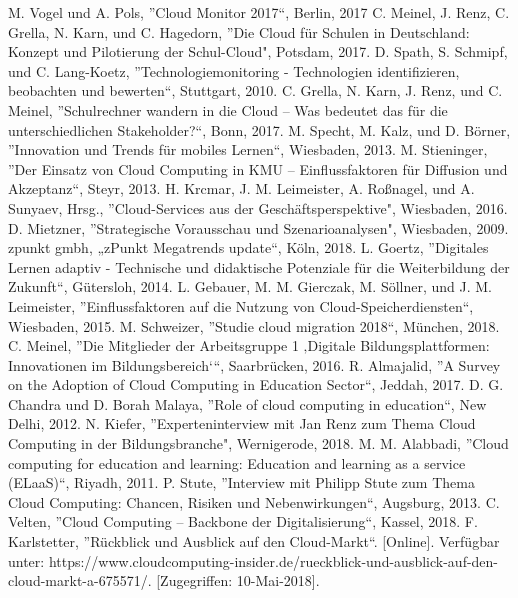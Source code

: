 \documentclass[conference]{IEEEtran}
\begin{document}
\begin{thebibliography}{00}
M. Vogel und A. Pols, ''Cloud Monitor 2017“, Berlin, 2017
 C. Meinel, J. Renz, C. Grella, N. Karn, und C. Hagedorn, ''Die Cloud für Schulen in Deutschland: Konzept und Pilotierung der Schul-Cloud", Potsdam, 2017.
D. Spath, S. Schmipf, und C. Lang-Koetz, ''Technologiemonitoring - Technologien identifizieren, beobachten und bewerten“, Stuttgart, 2010.
 C. Grella, N. Karn, J. Renz, und C. Meinel, ''Schulrechner wandern in die Cloud – Was bedeutet das für die unterschiedlichen Stakeholder?“, Bonn, 2017.
 M. Specht, M. Kalz, und D. Börner, ''Innovation und Trends für mobiles Lernen“, Wiesbaden, 2013.
 M. Stieninger, ''Der Einsatz von Cloud Computing in KMU – Einflussfaktoren für Diffusion und Akzeptanz“, Steyr, 2013.
 H. Krcmar, J. M. Leimeister, A. Roßnagel, und A. Sunyaev, Hrsg., ''Cloud-Services aus der Geschäftsperspektive", Wiesbaden, 2016.
 D. Mietzner, ''Strategische Vorausschau und Szenarioanalysen", Wiesbaden, 2009.
zpunkt gmbh, „zPunkt Megatrends update“, Köln, 2018.
 L. Goertz, ''Digitales Lernen adaptiv - Technische und didaktische Potenziale für die Weiterbildung der Zukunft“, Gütersloh, 2014.
 L. Gebauer, M. M. Gierczak, M. Söllner, und J. M. Leimeister, ''Einflussfaktoren auf die Nutzung von Cloud-Speicherdiensten“, Wiesbaden, 2015.
 M. Schweizer, ''Studie cloud migration 2018“, München, 2018.
 C. Meinel, ''Die Mitglieder der Arbeitsgruppe 1 ‚Digitale Bildungsplattformen: Innovationen im Bildungsbereich‘“, Saarbrücken, 2016.
 R. Almajalid, ''A Survey on the Adoption of Cloud Computing in Education Sector“, Jeddah, 2017.
 D. G. Chandra und D. Borah Malaya, ''Role of cloud computing in education“, New Delhi, 2012.
 N. Kiefer, ''Experteninterview mit Jan Renz zum Thema Cloud Computing in der Bildungsbranche", Wernigerode, 2018.
 M. M. Alabbadi, ''Cloud computing for education and learning: Education and learning as a service (ELaaS)“, Riyadh, 2011.
 P. Stute, ''Interview mit Philipp Stute zum Thema Cloud Computing: Chancen, Risiken und Nebenwirkungen“, Augsburg, 2013.
 C. Velten, ''Cloud Computing – Backbone der Digitalisierung“, Kassel, 2018.
 F. Karlstetter, ''Rückblick und Ausblick auf den Cloud-Markt“. [Online]. Verfügbar unter: https://www.cloudcomputing-insider.de/rueckblick-und-ausblick-auf-den-cloud-markt-a-675571/. [Zugegriffen: 10-Mai-2018].

\end{thebibliography}
\end{document}
